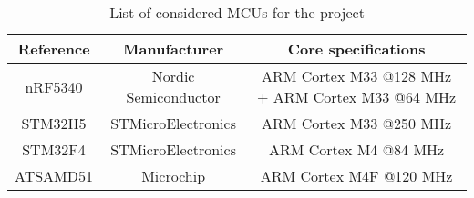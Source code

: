 \begin{table}[!hbt]
    \centering
    \begin{tabular}{| c || c | c |}
    \hline
    Reference &  Manufacturer & Core specifications\\
    \hline
    \hline
    nRF5340 & Nordic Semiconductor & ARM Cortex M33 @128 MHz + ARM Cortex M33 @64 MHz\\
    STM32H5 & STMicroElectronics & ARM Cortex M33 @250 MHz\\
    STM32F4 & STMicroElectronics & ARM Cortex M4 @84 MHz\\
    ATSAMD51 & Microchip & ARM Cortex M4F @120 MHz\\
    \hline
    \end{tabular}
    \caption{List of considered MCUs for the project}
    \label{tab:mcu_list}
\end{table}
\FloatBarrier